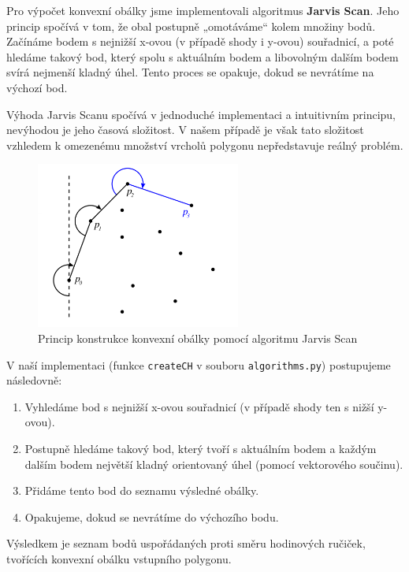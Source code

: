 \documentclass[a4paper,12pt]{article}
\begin{document}
Pro výpočet konvexní obálky jsme implementovali algoritmus \textbf{Jarvis Scan}. Jeho princip spočívá v tom, že obal postupně „omotáváme“ kolem množiny bodů. Začínáme bodem s nejnižší x-ovou (v případě shody i y-ovou) souřadnicí, a poté hledáme takový bod, který spolu s aktuálním bodem a libovolným dalším bodem svírá nejmenší kladný úhel. Tento proces se opakuje, dokud se nevrátíme na výchozí bod.

Výhoda Jarvis Scanu spočívá v jednoduché implementaci a intuitivním principu, nevýhodou je jeho časová složitost. V našem případě je však tato složitost vzhledem k omezenému množství vrcholů polygonu nepředstavuje reálný problém.

\begin{figure}[H]
    \centering
    \includegraphics[width=0.6\textwidth]{jarscan.png}
    \caption{Princip konstrukce konvexní obálky pomocí algoritmu Jarvis Scan \parencite{wikimedia_jarvis}}
    \label{fig:jarvis_scan}
\end{figure}

V naší implementaci (funkce \texttt{createCH} v souboru \texttt{algorithms.py}) postupujeme následovně:
\begin{enumerate}
    \item Vyhledáme bod s nejnižší x-ovou souřadnicí (v případě shody ten s nižší y-ovou).
    \item Postupně hledáme takový bod, který tvoří s aktuálním bodem a každým dalším bodem největší kladný orientovaný úhel (pomocí vektorového součinu).
    \item Přidáme tento bod do seznamu výsledné obálky.
    \item Opakujeme, dokud se nevrátíme do výchozího bodu.
\end{enumerate}

Výsledkem je seznam bodů uspořádaných proti směru hodinových ručiček, tvořících konvexní obálku vstupního polygonu.
\end{document}
